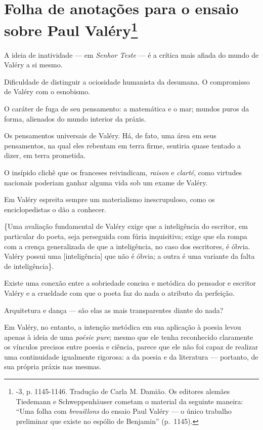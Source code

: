 
\chapter{Folha de anotações para o ensaio sobre Paul Valéry\footnote[*]{-3, p. 1145-1146. Tradução de Carla M. Damião. Os
  editores alemães Tiedemann e Schweppenhäuser cometam o material da
  seguinte maneira: ``Uma folha com \emph{brouillons} do ensaio Paul
  Valéry --- o único trabalho preliminar que existe no espólio de
  Benjamin'' (p.~1145).}}

A ideia de inatividade --- em \emph{Senhor Teste} --- é a crítica mais afiada do
mundo de Valéry a si mesmo.

Dificuldade de distinguir a ociosidade humanista da desumana. O
compromisso de Valéry com o esnobismo.

O caráter de fuga de seu pensamento: a matemática e o mar; mundos puros
da forma, alienados do mundo interior da práxis.

Os pensamentos universais de Valéry. Há, de fato, uma área em seus
pensamentos, na qual eles rebentam em terra firme, sentiria quase tentado
a dizer, em terra prometida.

O insípido clichê que os franceses reivindicam, \emph{raison} e
\emph{clarté}, como virtudes nacionais poderiam ganhar alguma vida %
sob um exame de Valéry.

Em Valéry espreita sempre um materialismo inescrupuloso, como os
enciclopedistas o dão a conhecer.

\{Uma avaliação fundamental de Valéry exige que a inteligência do escritor,
em particular do poeta, seja perseguida com fúria inquisitiva; exige que
ela rompa com a crença generalizada de que a inteligência, no caso dos
escritores, é óbvia. Valéry possui uma {[}inteligência{]} que não é
óbvia; a outra é uma variante da falta de inteligência\}.

Existe uma conexão entre a sobriedade concisa e metódica do
pensador e escritor Valéry e a crueldade com que o poeta faz do nada o
atributo da perfeição.

Arquitetura e dança --- são elas as mais transparentes diante do nada?

Em Valéry, no entanto, a intenção metódica em sua aplicação à poesia
levou apenas à ideia de uma \emph{poésie pure}; mesmo que ele tenha
reconhecido claramente os vínculos precisos entre poesia e ciência,
parece que ele não foi capaz de realizar uma continuidade igualmente
rigorosa: a da poesia e da literatura --- portanto, de sua própria práxis
nas mesmas.

